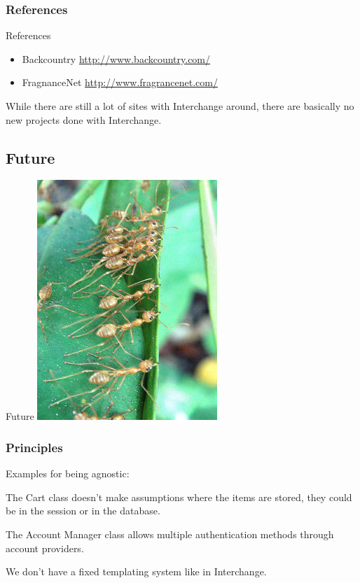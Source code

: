 \subsubsection{References}
\begin{frame}{References}
\begin{itemize}
\item Backcountry \url{http://www.backcountry.com/}
\item FragnanceNet \url{http://www.fragrancenet.com/}
\end{itemize}
\end{frame}

While there are still a lot of sites with Interchange around,
there are basically no new projects done with Interchange.

\subsection{Future}
\begin{frame}{Future}
  \includegraphics{ants.jpg}
\end{frame}

\subsubsection{Principles}
Examples for being agnostic:

The Cart class doesn't make assumptions where the items are
stored, they could be in the session or in the database.

The Account Manager class allows multiple authentication
methods through account providers.

We don't have a fixed templating system like in Interchange.

